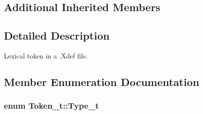 \subsection*{Additional Inherited Members}


\subsection{Detailed Description}
Lexical token in a .Xdef file. 

\subsection{Member Enumeration Documentation}
\subsubsection[{\texorpdfstring{Type\+\_\+t}{Type_t}}]{\setlength{\rightskip}{0pt plus 5cm}enum {\bf Token\+\_\+t\+::\+Type\+\_\+t}}\hypertarget{struct_token__t_a344cbfed08291bcbc163935eb646c601}{}\label{struct_token__t_a344cbfed08291bcbc163935eb646c601}
